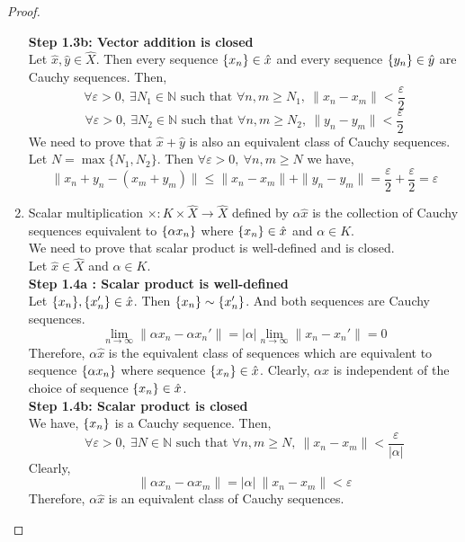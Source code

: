 \begin{proof}
\begin{enumerate}
			\textbf{Step 1.3b: Vector addition is closed}\\
			Let $\hat{x},\hat{y} \in \hat{X}$.
			Then every sequence $\{x_n\} \in \hat{x}$ and every sequence $\{y_n\} \in \hat{y}$ are Cauchy sequences.
			Then,
			$$ \forall \varepsilon > 0,\ \exists N_1 \in \mathbb{N} \text{ such that } \forall n,m \ge N_1,\ \| x_n - x_m \| < \frac{\varepsilon}{2} $$
			$$ \forall \varepsilon > 0,\ \exists N_2 \in \mathbb{N} \text{ such that } \forall n,m \ge N_2,\ \| y_n - y_m \| < \frac{\varepsilon}{2} $$
			We need to prove that $\hat{x}+\hat{y}$ is also an equivalent class of Cauchy sequences.
			Let $N = \max\{ N_1,N_2 \}$.
			Then $\forall \varepsilon > 0,\ \forall n,m \ge N$ we have,
			$$ \| x_n+y_n - (x_m+y_m) \| \le \| x_n - x_m \| + \| y_n - y_m \| = \frac{\varepsilon}{2} + \frac{\varepsilon}{2} = \varepsilon $$
		\item Scalar multiplication $\times : K \times \hat{X} \to \hat{X}$ defined by $\alpha \hat{x}$ is the collection of Cauchy sequences equivalent to $\{\alpha x_n\}$ where $\{x_n\} \in \hat{x}$ and $\alpha \in K$.\\

			We need to prove that scalar product is well-defined and is closed.\\
			Let $\hat{x} \in \hat{X}$ and $\alpha \in K$.\\

			\textbf{Step 1.4a : Scalar product is well-defined}\\
			Let $\{x_n\},\{x_n'\} \in \hat{x}$.
			Then $\{x_n\} \sim \{x_n'\}$.
			And both sequences are Cauchy sequences.
			$$ \lim_{n \to \infty} \| \alpha x_n - \alpha x_n' \| = |\alpha| \lim_{n \to \infty} \| x_n - x_n' \| = 0 $$
			Therefore, $\alpha\hat{x}$ is the equivalent class of sequences which are equivalent to sequence $\{\alpha x_n\}$ where sequence $\{x_n\} \in \hat{x}$.
			Clearly, $\alpha\hat{x}$ is independent of the choice of sequence $\{x_n\} \in \hat{x}$.\\

			\textbf{Step 1.4b: Scalar product is closed}\\
			We have, $\{x_n\}$ is a Cauchy sequence.
			Then, 
			$$\forall \varepsilon > 0,\ \exists N \in \mathbb{N} \text{ such that } \forall n,m \ge N,\ \| x_n - x_m \| < \frac{\varepsilon}{|\alpha|} $$
			Clearly,
			$$ \| \alpha x_n - \alpha x_m \| = |\alpha|\ \| x_n - x_m \| < \varepsilon $$
			Therefore, $\alpha\hat{x}$ is an equivalent class of Cauchy sequences.
	\end{enumerate}


\end{proof}
